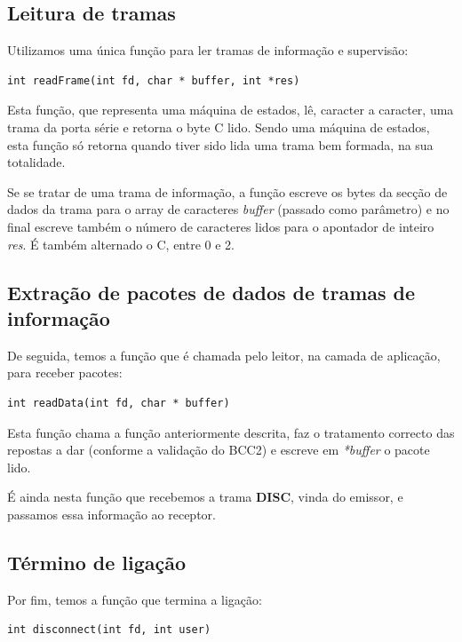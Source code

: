 \documentclass[a4paper,11pt]{article}
\begin{document}
\subsection{Leitura de tramas}

Utilizamos uma única função para ler tramas de informação e supervisão:

\begin{lstlisting}
int readFrame(int fd, char * buffer, int *res)
\end{lstlisting}

Esta função, que representa uma máquina de estados, lê, caracter a caracter, uma trama da porta série e retorna o byte C lido. Sendo uma máquina de estados, esta função só retorna quando tiver sido lida uma trama bem formada, na sua totalidade.

Se se tratar de uma trama de informação, a função escreve os bytes da secção de dados da trama para o array de caracteres \textit{buffer} (passado como parâmetro) e no final escreve também o número de caracteres lidos para o apontador de inteiro \textit{res}. É também alternado o C, entre 0 e 2.

\subsection{Extração de pacotes de dados de tramas de informação}

De seguida, temos a função que é chamada pelo leitor, na camada de aplicação, para receber pacotes:

\begin{lstlisting}
int readData(int fd, char * buffer)
\end{lstlisting}

Esta função chama a função anteriormente descrita, faz o tratamento correcto das repostas a dar (conforme a validação do BCC2) e escreve em \textit{*buffer} o pacote lido.

É ainda nesta função que recebemos a trama \textbf{DISC}, vinda do emissor, e passamos essa informação ao receptor.

\subsection{Término de ligação}

Por fim, temos a função que termina a ligação:

\begin{lstlisting}
int disconnect(int fd, int user)
\end{lstlisting}
\end{document}
